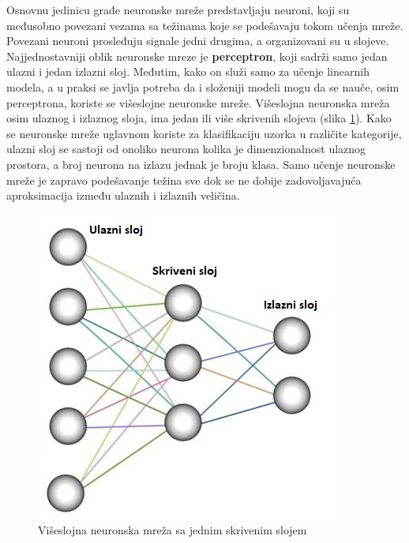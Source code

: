 \documentclass[a4paper]{article}
\begin{document}
Osnovnu jedinicu građe neuronske mreže predstavljaju neuroni, koji su međusobno povezani vezama sa težinama koje se podešavaju tokom učenja mreže. Povezani neuroni prosleđuju signale jedni drugima, a organizovani su u slojeve. Najjednostavniji oblik neuronske mreze je \textbf{perceptron}, koji sadrži samo jedan ulazni i jedan izlazni sloj. Međutim, kako on služi samo za učenje linearnih modela, a u praksi se javlja potreba da i složeniji modeli mogu da se nauče, osim perceptrona, koriste se višeslojne neuronske mreže. Višeslojna neuronska mreža osim ulaznog i izlaznog sloja, ima jedan ili više skrivenih slojeva (slika \ref{fig:neural_network_layers}).
Kako se neuronske mreže uglavnom koriste za klasifikaciju uzorka u različite kategorije, ulazni sloj se sastoji od onoliko neurona kolika je dimenzionalnost ulaznog prostora, a broj neurona na izlazu jednak je broju klasa. Samo učenje neuronske mreže je zapravo podešavanje težina sve dok se ne dobije zadovoljavajuća aproksimacija između ulaznih i izlaznih veličina.

\begin{figure}[h!]
\begin{center}
\includegraphics[scale=1]{neural_network_layers.jpeg}
\end{center}
\caption{Višeslojna neuronska mreža sa jednim skrivenim slojem}
\label{fig:neural_network_layers}
\end{figure}
\end{document}
